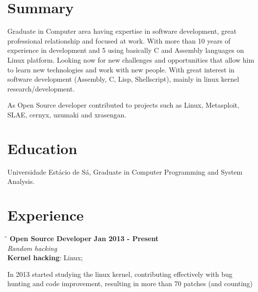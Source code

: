 \documentclass[margin]{res}
\begin{document}

\address{Juazeiro do Norte, CE, Brazil \\
  \href{mailto:geyslan@gmail.com}{geyslan@gmail.com} \\ Phone: 55 88 99617 0441}


\begin{resume}

  \section{Summary} Graduate in Computer area having expertise in software
  development, great professional relationship and focused at work.
  With more than 10 years of experience in development and 5 using
  basically C and Assembly languages on Linux platform. Looking now
  for new challenges and opportunities that allow him to learn new
  technologies and work with new people. With great interest in
  software development (Assembly, C, Lisp, Shellscript), mainly in
  linux kernel research/development.

  As Open Source developer contributed to projects such as Linux,
  Metasploit, SLAE, cernyx, uzumaki and xrasengan.

  \section{Education} Universidade Estácio de Sá, Graduate in Computer
  Programming and System Analysis.

\section{Experience}

\vspace{-0.1in}
\begin{tabbing}
  \hspace{2.3in}\= \hspace{1.7in}\= \kill %
  \textbf{Open Source Developer}    \>\>\textbf{Jan 2013 - Present}\\
  \textit{Random hacking}\\
  \textbf{Kernel hacking}: Linux;
\end{tabbing}\vspace{-20pt}      %
\vspace{2mm} In 2013 started studying the linux kernel, contributing
effectively with bug hunting and code improvement, resulting in more
than 70 patches (and counting)


\end{resume}
\end{document}
